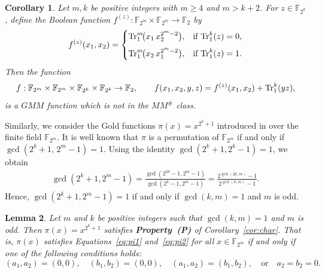 \documentclass[12pt]{article}
\theoremstyle{plain}
\newtheorem{lemma}{Lemma}
\newtheorem{corollary}[lemma]{Corollary}
\theoremstyle{definition}
\renewcommand{\to}{\rightarrow}
\newcommand{\Tr}{{\rm Tr}}
\begin{document}
	\begin{corollary}\label{cor:ex1}
		Let \(m,k\) be positive integers with \(m\geq 4\) and \(m > k+2\).
		For \(z\in \mathbb{F}_{2^k}\), define the Boolean function
		\(f^{(z)}:\mathbb{F}_{2^m}\times\mathbb{F}_{2^m}\to \mathbb{F}_{2}\) by
		\[
		f^{(z)}(x_1,x_2)=
		\begin{cases}
		\Tr_1^m\!\bigl(x_1\,x_2^{2^m-2}\bigr), & \text{if } \Tr_1^k(z)=0, \\[6pt]
		\Tr_1^m\!\bigl(x_2\,x_1^{2^m-2}\bigr), & \text{if } \Tr_1^k(z)=1.
		\end{cases}
		\]
		Then the function
		\[
		f:\mathbb{F}_{2^m}\times\mathbb{F}_{2^m}\times
		\mathbb{F}_{2^k}\times\mathbb{F}_{2^k}\to \mathbb{F}_{2},
		\qquad
		f(x_1,x_2,y,z)=f^{(z)}(x_1,x_2)+\Tr_1^k(yz),
		\]
		is a \(GMM\) function which is not in the \(MM^{\#}\) class.
	\end{corollary}
	
	Similarly, we consider the Gold functions $\pi(x)=x^{2^k+1}$ introduced in \cite{gold} over the finite field $\mathbb{F}_{2^m}$. 
	It is well known that $\pi$ is a permutation of $\mathbb{F}_{2^m}$ if and only if $\gcd(2^k+1,\,2^m-1)=1$.
	Using the identity $\gcd(2^k+1,2^k-1)=1$, we obtain
	\begin{align*}
		\gcd(2^k+1,2^m-1)
		= \frac{\gcd(2^{2k}-1,2^m-1)}{\gcd(2^k-1,2^m-1)} = \frac{2^{\gcd(2k,m)}-1}{2^{\gcd(k,m)}-1}.
	\end{align*}
	Hence, $\gcd(2^k+1,2^m-1)=1$ if and only if $\gcd(k,m)=1$ and $m$ is odd. 
	
	\begin{lemma} \label{lem:gold}
		Let $m$ and $k$ be positive integers such that $\gcd(k,m)=1$ and $m$ is odd.
		Then $\pi(x)=x^{2^k+1}$ satisfies \textbf{Property~(P)}
		of Corollary~\ref{cor:char}. That is, $\pi(x)$
		satisfies Equations~\eqref{eq:pi1}
		and~\eqref{eq:pi2} for all $x\in\mathbb{F}_{2^m}$ if and only if one of the
		following conditions holds:
		\[
		(a_1,a_2)=(0,0), \quad (b_1,b_2)=(0,0), \quad (a_1,a_2)=(b_1,b_2),
		\quad \text{or} \quad a_2=b_2=0.
		\]
	\end{lemma}
	
\end{document}
